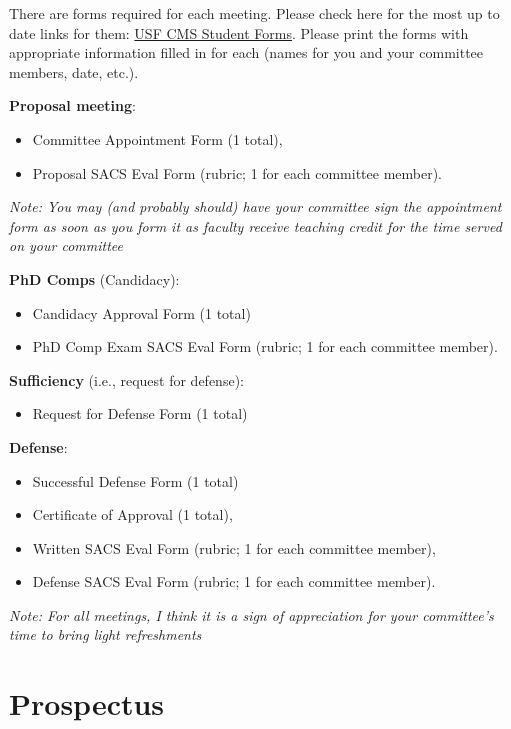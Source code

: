 \documentclass[
]{article}
\providecommand{\tightlist}{%
  \setlength{\itemsep}{0pt}\setlength{\parskip}{0pt}}
\begin{document}
There are forms required for each meeting. Please check here for the most up to date links for them: \href{https://www.marine.usf.edu/education/current-students/forms/}{USF CMS Student Forms}. Please print the forms with appropriate information filled in for each (names for you and your committee members, date, etc.).

\textbf{Proposal meeting}:

\begin{itemize}
\tightlist
\item
  Committee Appointment Form (1 total),
\item
  Proposal SACS Eval Form (rubric; 1 for each committee member).
\end{itemize}

\emph{Note: You may (and probably should) have your committee sign the appointment form as soon as you form it as faculty receive teaching credit for the time served on your committee}

\textbf{PhD Comps} (Candidacy):

\begin{itemize}
\tightlist
\item
  Candidacy Approval Form (1 total)
\item
  PhD Comp Exam SACS Eval Form (rubric; 1 for each committee member).
\end{itemize}

\textbf{Sufficiency} (i.e., request for defense):

\begin{itemize}
\tightlist
\item
  Request for Defense Form (1 total)
\end{itemize}

\textbf{Defense}:

\begin{itemize}
\tightlist
\item
  Successful Defense Form (1 total)
\item
  Certificate of Approval (1 total),
\item
  Written SACS Eval Form (rubric; 1 for each committee member),
\item
  Defense SACS Eval Form (rubric; 1 for each committee member).
\end{itemize}

\emph{Note: For all meetings, I think it is a sign of appreciation for your committee's time to bring light refreshments}

\hypertarget{prospectus}{%
\section{\texorpdfstring{\textbf{Prospectus}}{Prospectus}}\label{prospectus}}
\end{document}
